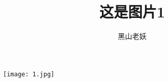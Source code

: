 \documentclass{ctexart}
\title{这是图片1}
\author{黑山老妖}
\begin{document}
\maketitle
\begin{center}
\texttt{[image: 1.jpg]}
\end{center}
\end{document}
